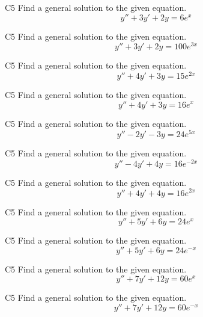\begin{problem}{C5}
Find a general solution to the given equation.
\[
y'' + 3y' + 2y = 6 e^x 
\]
\end{problem}

\begin{problem}{C5}
Find a general solution to the given equation.
\[
y'' + 3y' + 2y = 100 e^{3x} 
\]
\end{problem}


\begin{problem}{C5}
Find a general solution to the given equation.
\[
y'' + 4y' + 3y = 15 e^{2x}
\]
\end{problem}

\begin{problem}{C5}
Find a general solution to the given equation.
\[
y'' + 4y' + 3y = 16 e^{x}
\]
\end{problem}


\begin{problem}{C5}
Find a general solution to the given equation.
\[
y'' - 2y' - 3y = 24 e^{5x}
\]
\end{problem}


\begin{problem}{C5}
Find a general solution to the given equation.
\[
y'' - 4y' + 4y = 16 e^{-2x}
\]
\end{problem}

\begin{problem}{C5}
Find a general solution to the given equation.
\[
y'' + 4y' + 4y = 16 e^{2x}
\]
\end{problem}

\begin{problem}{C5}
Find a general solution to the given equation.
\[
y'' + 5y' + 6y = 24 e^{x}
\]
\end{problem}


\begin{problem}{C5}
Find a general solution to the given equation.
\[
y'' + 5y' + 6y = 24 e^{-x}
\]
\end{problem}

\begin{problem}{C5}
Find a general solution to the given equation.
\[
y'' + 7y' + 12y = 60 e^{x}
\]
\end{problem}

\begin{problem}{C5}
Find a general solution to the given equation.
\[
y'' + 7y' + 12y = 60 e^{-x}
\]
\end{problem}
